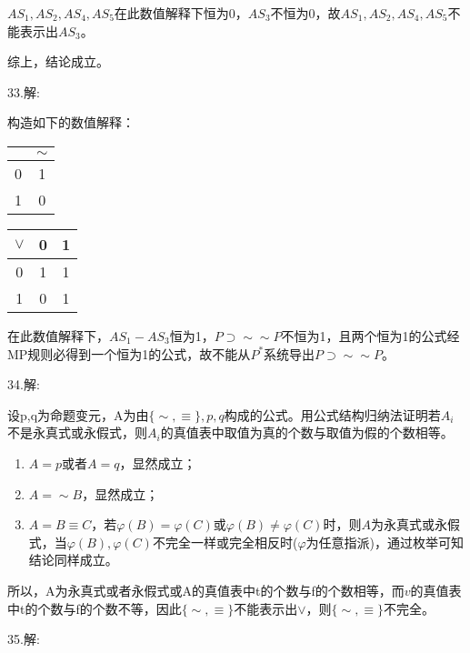 \documentclass[a4paper]{ctexart}
\begin{document}
\begin{enumerate}
  $AS_1,AS_2,AS_4,AS_5$在此数值解释下恒为0，$AS_3$不恒为0，故$AS_1,AS_2,AS_4,AS_5$不能表示出$AS_3$。
  
  综上，结论成立。
\end{enumerate}

\noindent 33.解:

构造如下的数值解释：
\begin{table}[H]
  \begin{tabular}{c|c}
    & $\sim$ \\
    \hline
    0 & 1 \\
    1 & 0 \\
  \end{tabular}
  \hfil
  \begin{tabular}{c|cc}
    $\vee$ & 0 & 1  \\
    \hline
    0 & 1 & 1  \\
    1 & 0 & 1  \\
  \end{tabular}    
\end{table}

在此数值解释下，$AS_1-AS_3$恒为1，$P\supset \sim\sim P$不恒为1，且两个恒为1的公式经MP规则必得到一个恒为1的公式，故不能从$P^*$系统导出$P\supset \sim\sim P$。

\noindent 34.解:

设p,q为命题变元，A为由$\{\sim,\equiv\},p,q$构成的公式。用公式结构归纳法证明若$A_i$不是永真式或永假式，则$A_i$的真值表中取值为真的个数与取值为假的个数相等。
\begin{enumerate}
  \item $A=p$或者$A=q$，显然成立；
  \item $A=\sim B$，显然成立；
  \item $A=B\equiv C$，若$\varphi(B)=\varphi(C)$或$\varphi(B)\neq\varphi(C)$时，则$A$为永真式或永假式，当$\varphi(B),\varphi(C)$不完全一样或完全相反时($\varphi$为任意指派)，通过枚举可知结论同样成立。
\end{enumerate}
所以，A为永真式或者永假式或A的真值表中t的个数与f的个数相等，而$v$的真值表中t的个数与f的个数不等，因此$\{\sim,\equiv\}$不能表示出$\vee$，则$\{\sim,\equiv\}$不完全。\newline

\noindent 35.解:
\end{document}
